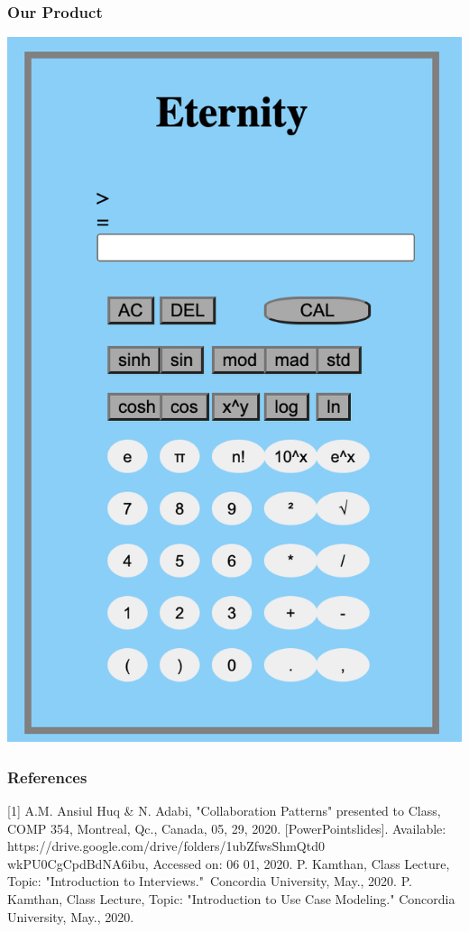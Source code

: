 \documentclass{beamer}
\begin{document}
\begin{frame}
\frametitle{Our Product}
\centering
\includegraphics[scale = 0.4]{Calculator}
\end{frame}


\begin{frame}
\frametitle{References}
[1] A.M. Ansiul Huq \& N. Adabi, "Collaboration Patterns" presented to Class, COMP 354, Montreal, Qc., Canada, 05, 29, 2020. [PowerPointslides]. Available: https://drive.google.com/drive/folders/1ubZfwsSh\textunderscore mQtd0
\newline wkPU0CgCpdBdNA6ibu, Accessed on: 06 01, 2020.
\newline\newline
[2] P. Kamthan, Class Lecture, Topic: "Introduction to Interviews." Concordia University, May., 2020.
\newline\newline
[3] P. Kamthan, Class Lecture, Topic: "Introduction to Use Case Modeling." Concordia University, May., 2020.

\end{frame}
\end{document}
